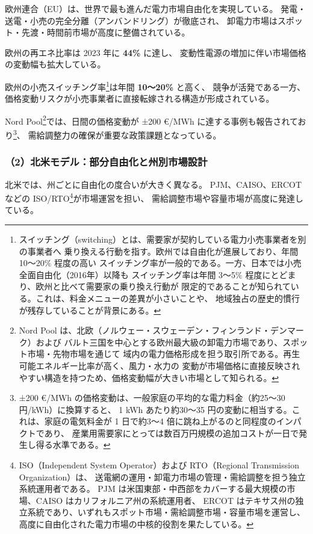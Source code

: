 欧州連合（EU）は、世界で最も進んだ電力市場自由化を実現している。
発電・送電・小売の完全分離（アンバンドリング）が徹底され、
卸電力市場はスポット・先渡・時間前市場が高度に整備されている。

欧州の再エネ比率は 2023 年に \textbf{44\%} に達し、
変動性電源の増加に伴い市場価格の変動幅も拡大している。

欧州の小売スイッチング率\footnote{
スイッチング（switching）とは、需要家が契約している電力小売事業者を別の事業者へ
乗り換える行動を指す。欧州では自由化が進展しており、年間 10〜20\% 程度の高い
スイッチング率が一般的である。一方、日本では小売全面自由化（2016年）以降も
スイッチング率は年間 3〜5\% 程度にとどまり、欧州と比べて需要家の乗り換え行動が
限定的であることが知られている。これは、料金メニューの差異が小さいことや、
地域独占の歴史的慣行が残存していることが背景にある。
}は年間 \textbf{10〜20\%} と高く、
競争が活発である一方、価格変動リスクが小売事業者に直接転嫁される構造が形成されている。

Nord Pool\footnote{
Nord Pool は、北欧（ノルウェー・スウェーデン・フィンランド・デンマーク）および
バルト三国を中心とする欧州最大級の卸電力市場であり、スポット市場・先物市場を通じて
域内の電力価格形成を担う取引所である。再生可能エネルギー比率が高く、風力・水力の
変動が市場価格に直接反映されやすい構造を持つため、価格変動幅が大きい市場として知られる。
}では、日間の価格変動が ±200 €/MWh に達する事例も報告されており\footnote{
±200 €/MWh の価格変動は、一般家庭の平均的な電力料金（約25～30 円/kWh）に換算すると、
1 kWh あたり約30～35 円の変動に相当する。これは、家庭の電気料金が
1 日で約3～4 倍に跳ね上がるのと同程度のインパクトであり、
産業用需要家にとっては数百万円規模の追加コストが一日で発生し得る水準である。
}、
需給調整力の確保が重要な政策課題となっている。


\subsubsection{（2）北米モデル：部分自由化と州別市場設計}

北米では、州ごとに自由化の度合いが大きく異なる。
PJM、CAISO、ERCOT などの ISO/RTO\footnote{
ISO（Independent System Operator）および RTO（Regional Transmission Organization）は、
送電網の運用・卸電力市場の管理・需給調整を担う独立系統運用者である。
PJM は米国東部・中西部をカバーする最大規模の市場、CAISO はカリフォルニア州の系統運用者、
ERCOT はテキサス州の独立系統であり、いずれもスポット市場・需給調整市場・容量市場を運営し、
高度に自由化された電力市場の中核的役割を果たしている。
}が市場運営を担い、
需給調整市場や容量市場が高度に発達している。

